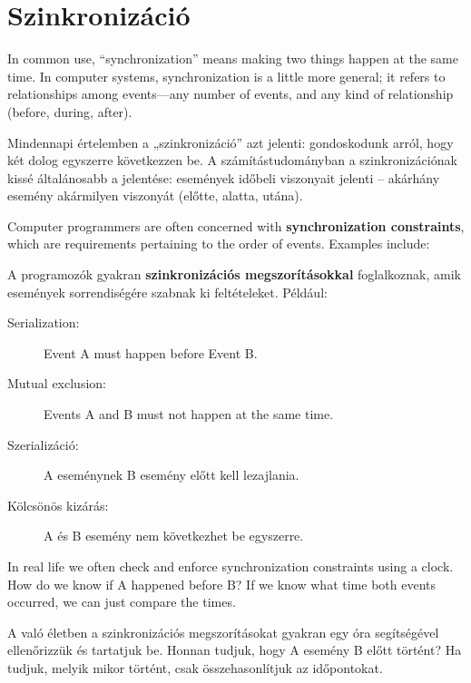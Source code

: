 \documentclass{book}
\begin{document}
\section{Szinkronizáció}
\label{synch}

In common use, ``synchronization'' means making two things happen
at the same time.  In computer systems, synchronization is a little
more general; it refers to relationships among events---any number
of events, and any kind of relationship (before, during, after).

Mindennapi értelemben a „szinkronizáció” azt jelenti: gondoskodunk
arról, hogy két dolog egyszerre következzen be. A számítástudományban
a szinkronizációnak kissé általánosabb a jelentése: események
időbeli viszonyait jelenti -- akárhány esemény akármilyen viszonyát
(előtte, alatta, utána).

Computer programmers are often concerned with {\bf synchronization
constraints}, which are requirements pertaining to the order of
events.  Examples include:

A programozók gyakran {\bf szinkronizációs megszorításokkal} foglalkoznak,
amik események sorrendiségére szabnak ki feltételeket. Például:

\begin{description}

\item[Serialization:] Event A must happen before Event B.

\item[Mutual exclusion:] Events A and B must not happen at the same time.

\end{description}

\begin{description}

\item[Szerializáció:] A eseménynek B esemény előtt kell lezajlania.

\item[Kölcsönös kizárás:] A és B esemény nem következhet be egyszerre.

\end{description}

In real life we often check and enforce synchronization constraints 
using a clock.  How do we know if A happened before B?  If we
know what time both events occurred, we can just compare the times.

A való életben a szinkronizációs megszorításokat gyakran egy óra
segítségével ellenőrizzük és tartatjuk be. Honnan tudjuk, hogy A
esemény B előtt történt? Ha tudjuk, melyik mikor történt, csak
összehasonlítjuk az időpontokat.
\end{document}
